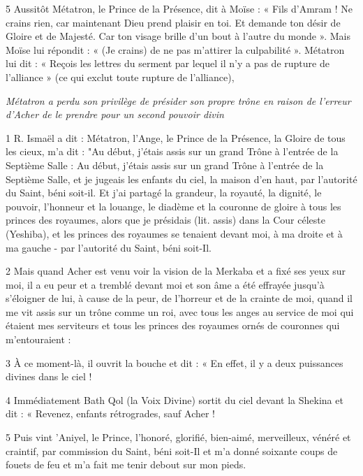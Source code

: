 \par 5 Aussitôt Métatron, le Prince de la Présence, dit à Moïse : « Fils d'Amram ! Ne crains rien, car maintenant Dieu prend plaisir en toi. Et demande ton désir de Gloire et de Majesté. Car ton visage brille d’un bout à l’autre du monde ». Mais Moïse lui répondit : « (Je crains) de ne pas m'attirer la culpabilité ». Métatron lui dit : « Reçois les lettres du serment par lequel il n'y a pas de rupture de l'alliance » (ce qui exclut toute rupture de l'alliance),


\par \textit{Métatron a perdu son privilège de présider son propre trône en raison de l'erreur d'Acher de le prendre pour un second pouvoir divin}

\par 1 R. Ismaël a dit : Métatron, l'Ange, le Prince de la Présence, la Gloire de tous les cieux, m'a dit : "Au début, j'étais assis sur un grand Trône à l'entrée de la Septième Salle : Au début, j'étais assis sur un grand Trône à l'entrée de la Septième Salle, et je jugeais les enfants du ciel, la maison d'en haut, par l'autorité du Saint, béni soit-il. Et j'ai partagé la grandeur, la royauté, la dignité, le pouvoir, l'honneur et la louange, le diadème et la couronne de gloire à tous les princes des royaumes, alors que je présidais (lit. assis) dans la Cour céleste (Yeshiba), et les princes des royaumes se tenaient devant moi, à ma droite et à ma gauche - par l'autorité du Saint, béni soit-Il.

\par 2 Mais quand Acher est venu voir la vision de la Merkaba et a fixé ses yeux sur moi, il a eu peur et a tremblé devant moi et son âme a été effrayée jusqu'à s'éloigner de lui, à cause de la peur, de l'horreur et de la crainte de moi, quand il me vit assis sur un trône comme un roi, avec tous les anges au service de moi qui étaient mes serviteurs et tous les princes des royaumes ornés de couronnes qui m'entouraient :

\par 3 À ce moment-là, il ouvrit la bouche et dit : « En effet, il y a deux puissances divines dans le ciel !

\par 4 Immédiatement Bath Qol (la Voix Divine) sortit du ciel devant la Shekina et dit : « Revenez, enfants rétrogrades, sauf Acher !

\par 5 Puis vint 'Aniyel, le Prince, l'honoré, glorifié, bien-aimé, merveilleux, vénéré et craintif, par commission du Saint, béni soit-Il et m'a donné soixante coups de fouets de feu et m'a fait me tenir debout sur mon pieds.

